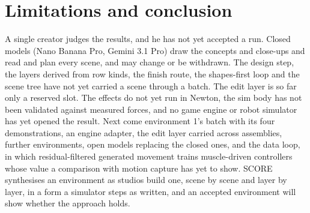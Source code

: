 \section{Limitations and conclusion}\label{limitations-and-conclusion}

A single creator judges the results, and he has not yet accepted a run. Closed models (Nano Banana Pro, Gemini 3.1 Pro) draw the concepts and close-ups and read and plan every scene, and may change or be withdrawn. The design step, the layers derived from row kinds, the finish route, the shapes-first loop and the scene tree have not yet carried a scene through a batch. The edit layer is so far only a reserved slot. The effects do not yet run in Newton, the sim body has not been validated against measured forces, and no game engine or robot simulator has yet opened the result. Next come environment 1's batch with its four demonstrations, an engine adapter, the edit layer carried across assemblies, further environments, open models replacing the closed ones, and the data loop, in which residual-filtered generated movement trains muscle-driven controllers whose value a comparison with motion capture has yet to show. SCORE synthesises an environment as studios build one, scene by scene and layer by layer, in a form a simulator steps as written, and an accepted environment will show whether the approach holds.

